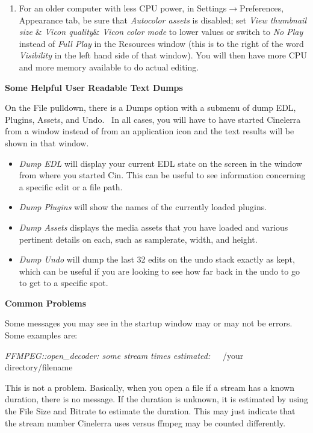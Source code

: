\begin{enumerate}[nosep]
	\item For an older computer with less CPU power, in Settings$\rightarrow$Preferences, Appearance tab, be sure that \textit{Autocolor assets }is disabled; set \textit{View thumbnail size} \& \textit{Vicon quality}\& \textit{Vicon color mode} to lower values or switch to \textit{No Play} instead of \textit{Full Play} in the Resources window (this is to the right of the word \textit{Visibility} in the left hand side of that window). You will then have more CPU and more memory available to do actual editing.
\end{enumerate}
\medskip

{\bfseries
Some Helpful User Readable Text Dumps}
\medskip

On the File pulldown, there is a {\textquotedbl}Dumps{\textquotedbl} option with a submenu of dump EDL, Plugins, Assets, and Undo. \ In all cases, you will have to have started Cinelerra from a window instead of from an application icon and
the text results will be shown in that window.
\medskip

\begin{itemize}[nosep]
\item \textit{Dump EDL} will display your current EDL state on the screen in the window from where you started Cin. This can be useful to see information concerning a specific edit or a file path.
\item \textit{Dump Plugins} will show the names of the currently loaded plugins.
\item \textit{Dump Assets} displays the media assets that you have loaded and various pertinent details on each, such as samplerate, width, and height.
\item \textit{Dump Undo }will dump the last 32 edits on the undo stack exactly as kept, which can be useful if you are looking to see how far back in the undo to go to get to a specific spot.
\end{itemize}
\medskip

{\bfseries
Common Problems}

Some messages you may see in the startup window may or may not be errors. Some examples are:
\bigskip

\textit{FFMPEG::open\_decoder: some stream times estimated:}\textbf{ \ \ }/your directory/filename
\medskip

This is not a problem. Basically, when you open a file if a stream has a known duration, there is no message. If the duration is unknown, it is estimated by using the File Size and Bitrate to estimate the duration. This may just indicate that the stream number Cinelerra uses versus ffmpeg may be counted differently.
\bigskip

